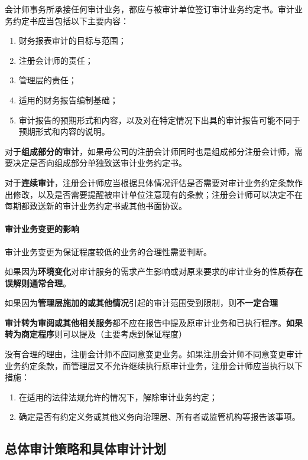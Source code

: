 \documentclass[UTF8,12pt]{ctexart}
\numberwithin{equation}{section} %
\numberwithin{figure}{section}
\numberwithin{table}{section}
\begin{document}
	会计师事务所承接任何审计业务，都应与被审计单位签订审计业务约定书。审计业务约定书应当包括以下主要内容：
	\begin{enumerate}
		\item 财务报表审计的目标与范围；
		
		\item 注册会计师的责任；
		
		\item 管理层的责任；
		
		\item 适用的财务报告编制基础；
		
		\item 审计报告的预期形式和内容，以及对在特定情况下出具的审计报告可能不同于预期形式和内容的说明。
	\end{enumerate}
	
	对于\textbf{组成部分的审计}，如果母公司的注册会计师同时也是组成部分注册会计师，需要决定是否向组成部分单独致送审计业务约定书。
	
	对于\textbf{连续审计}，注册会计师应当根据具体情况评估是否需要对审计业务约定条款作出修改，以及是否需要提醒被审计单位注意现有的条款；注册会计师可以决定不在每期都致送新的审计业务约定书或其他书面协议。
	
	\paragraph{审计业务变更的影响}
	审计业务变更为保证程度较低的业务的合理性需要判断。
	
	如果因为\textbf{环境变化}对审计服务的需求产生影响或对原来要求的审计业务的性质\textbf{存在误解}\textbf{则通常合理}。
	
	如果因为\textbf{管理层施加的或其他情况}引起的审计范围受到限制，则\textbf{不一定合理}
	
	\textbf{审计转为审阅或其他相关服务}都不应在报告中提及原审计业务和已执行程序。\textbf{如果转为商定程序}则可以提及（主要考虑到保证程度）
	
	没有合理的理由，注册会计师不应同意变更业务。如果注册会计师不同意变更审计业务约定条款，而管理层又不允许继续执行原审计业务，注册会计师应当执行以下措施：
	\begin{enumerate}
		\item 在适用的法律法规允许的情况下，解除审计业务约定；
		
		\item 确定是否有约定义务或其他义务向治理层、所有者或监管机构等报告该事项。
	\end{enumerate}
	
	\subsection{总体审计策略和具体审计计划}
	
\end{document}
